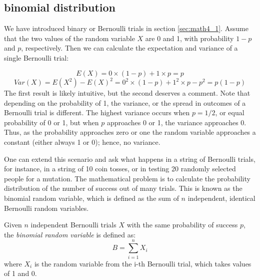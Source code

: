 \documentclass[
  letterpaper,
  DIV=11,
  numbers=noendperiod]{scrreprt}
\begin{document}
\hypertarget{binomial-distribution}{%
\subsection{binomial distribution}\label{binomial-distribution}}

We have introduced binary or Bernoulli trials in section
\ref{sec:math4_1}. Assume that the two values of the random variable
\(X\) are 0 and 1, with probability \(1-p\) and \(p\), respectively.
Then we can calculate the expectation and variance of a single Bernoulli
trial:

\[E(X) = 0 \times (1-p) + 1 \times p = p\]
\[ Var(X) = E(X^2) - E(X)^2 = 0^2 \times (1-p) + 1^2 \times p - p^2= p(1-p)\]
The first result is likely intuitive, but the second deserves a comment.
Note that depending on the probability of 1, the variance, or the spread
in outcomes of a Bernoulli trial is different. The highest variance
occurs when \(p=1/2\), or equal probability of 0 or 1, but when \(p\)
approaches 0 or 1, the variance approaches 0. Thus, as the probability
approaches zero or one the random variable approaches a constant (either
always 1 or 0); hence, no variance.

One can extend this scenario and ask what happens in a string of
Bernoulli trials, for instance, in a string of 10 coin tosses, or in
testing 20 randomly selected people for a mutation. The mathematical
problem is to calculate the probability distribution of the number of
success out of many trials. This is known as the binomial random
variable, which is defined as the sum of \(n\) independent, identical
Bernoulli random variables.

\begin{tcolorbox}[enhanced jigsaw, arc=.35mm, colframe=quarto-callout-note-color-frame, left=2mm, opacitybacktitle=0.6, breakable, title=\textcolor{quarto-callout-note-color}{\faInfo}\hspace{0.5em}{Definition}, toprule=.15mm, coltitle=black, bottomtitle=1mm, toptitle=1mm, colback=white, leftrule=.75mm, colbacktitle=quarto-callout-note-color!10!white, titlerule=0mm, opacityback=0, rightrule=.15mm, bottomrule=.15mm]

Given \(n\) independent Bernoulli trials \(X\) with the same probability
of success \(p\), the \emph{binomial random variable} is defined as:
\[B = \sum_{i=1}^n X_i\] where \(X_i\) is the random variable from the
i-th Bernoulli trial, which takes values of 1 and 0.

\end{tcolorbox}
\end{document}
